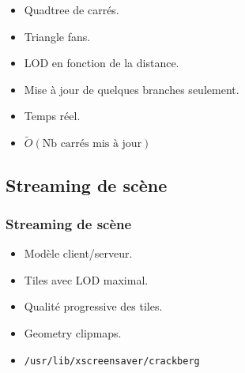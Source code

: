 \documentclass[hyperref={pdfpagelabels=false}]{beamer}
\begin{document}
\begin{frame}
\begin{figure}[h]
  \end{figure}
  \begin{itemize}
  \item Quadtree de carrés.
  \item Triangle fans.
  \item LOD en fonction de la distance.
  \item Mise à jour de quelques branches seulement.
  \item Temps réel.
  \item $\tilde O(\text{Nb carrés mis à jour})$
  \end{itemize}
\end{frame}

\subsection{Streaming de scène}
\begin{frame}
  \frametitle{Streaming de scène}
  \begin{itemize}
  \item Modèle client/serveur.
  \item Tiles avec LOD maximal.
  \item Qualité progressive des tiles.
  \item Geometry clipmaps.
  \item \texttt{/usr/lib/xscreensaver/crackberg}
  \end{itemize}
\end{frame}


\end{document}
